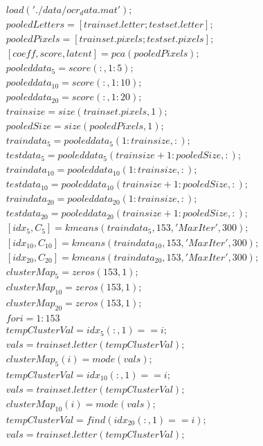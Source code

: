 \begin{enumerate}
\begin{align*}
 load('./data/ocr_data.mat'); \\
pooledLetters = [trainset.letter;testset.letter]; \\
pooledPixels = [trainset.pixels;testset.pixels]; \\
[coeff,score,latent] = pca(pooledPixels); \\
pooleddata_5 = score(:,1:5); \\
pooleddata_{10} = score(:,1:10); \\
pooleddata_{20} = score(:,1:20); \\
trainsize = size(trainset.pixels,1); \\
pooledSize = size(pooledPixels,1); \\
traindata_5 = pooleddata_5(1:trainsize,:); \\
testdata_5 = pooleddata_5(trainsize+1:pooledSize,:); \\
traindata_{10} =pooleddata_{10}(1:trainsize,:); \\
testdata_{10} = pooleddata_{10}(trainsize+1:pooledSize,:); \\
traindata_{20} =pooleddata_{20}(1:trainsize,:); \\
testdata_{20} =pooleddata_{20}(trainsize+1:pooledSize,:); \\
[idx_5,C_5] = kmeans(traindata_5,153,'MaxIter',300); \\
[idx_{10},C_{10}] = kmeans(traindata_{10},153,'MaxIter',300); \\
[idx_{20},C_{20}] = kmeans(traindata_{20},153,'MaxIter',300); \\
clusterMap_5 = zeros(153,1); \\
clusterMap_{10} = zeros(153,1); \\
clusterMap_{20} = zeros(153,1); \\
for i=1:153 \\
    tempClusterVal = idx_5(:,1) ==i; \\
    vals = trainset.letter(tempClusterVal); \\
    clusterMap_5(i) = mode(vals); \\
    tempClusterVal = idx_{10}(:,1) ==i; \\
    vals = trainset.letter(tempClusterVal); \\
    clusterMap_{10}(i) = mode(vals); \\
    tempClusterVal = find(idx_{20}(:,1) ==i); \\
    vals = trainset.letter(tempClusterVal); \\

\end{align*}
\end{enumerate}
